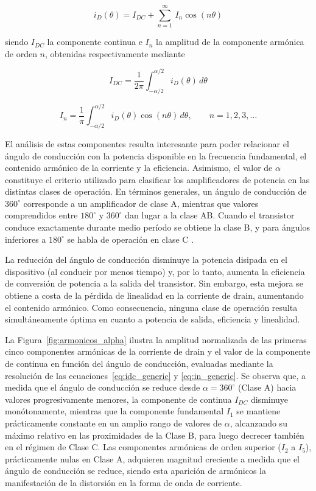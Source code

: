 \begin{equation}
i_D(\theta)= I_{DC} + \sum_{n=1}^{\infty}\,I_n\cos(n\theta)
\label{eq:fourier}
\end{equation}

siendo \(I_{DC}\) la componente continua e \(I_n\) la amplitud de la componente armónica de orden \(n\), obtenidas respectivamente mediante

\begin{equation}
    I_{DC} = \frac{1}{2\pi}\int_{-\alpha/2}^{\alpha/2} i_D(\theta)\,d\theta
    \label{eq:idc_generic}
\end{equation}

\begin{equation}
    I_n = \frac{1}{\pi}\int_{-\alpha/2}^{\alpha/2} i_D(\theta)\cos(n\theta)\,d\theta, \qquad n = 1, 2, 3, \dots
    \label{eq:in_generic}
\end{equation}

El análisis de estas componentes resulta interesante para poder relacionar el ángulo de conducción con la potencia disponible en la frecuencia fundamental, el contenido armónico de la corriente y la eficiencia. Asimismo, el valor de \(\alpha\) constituye el criterio utilizado para clasificar los amplificadores de potencia en las distintas clases de operación. En términos generales, un ángulo de conducción de \(360^\circ\) corresponde a un amplificador de clase A, mientras que valores comprendidos entre \(180^\circ\) y \(360^\circ\) dan lugar a la clase AB. Cuando el transistor conduce exactamente durante medio período se obtiene la clase B, y para ángulos inferiores a \(180^\circ\) se habla de operación en clase C \cite[p.~41]{cripps2006}.

La reducción del ángulo de conducción disminuye la potencia disipada en el dispositivo (al conducir por menos tiempo) y, por lo tanto, aumenta la eficiencia de conversión de potencia a la salida del transistor. Sin embargo, esta mejora se obtiene a costa de la pérdida de linealidad en la corriente de drain, aumentando el contenido armónico. Como consecuencia, ninguna clase de operación resulta simultáneamente óptima en cuanto a potencia de salida, eficiencia y linealidad.

La Figura~\ref{fig:armonicos_alpha} ilustra la amplitud normalizada de las primeras cinco componentes armónicas de la corriente de drain y el valor de la componente de continua en función del ángulo de conducción, evaluadas mediante la resolución de las ecuaciones~\eqref{eq:idc_generic} y \eqref{eq:in_generic}. Se observa que, a medida que el ángulo de conducción se reduce desde $\alpha = 360^\circ$ (Clase A) hacia valores progresivamente menores, la componente de continua $I_{DC}$ disminuye monótonamente, mientras que la componente fundamental $I_1$ se mantiene prácticamente constante en un amplio rango de valores de $\alpha$, alcanzando su máximo relativo en las proximidades de la Clase B, para luego decrecer también en el régimen de Clase C. Las componentes armónicas de orden superior ($I_2$ a $I_5$), prácticamente nulas en Clase A, adquieren magnitud creciente a medida que el ángulo de conducción se reduce, siendo esta aparición de armónicos la manifestación de la distorsión en la forma de onda de corriente.

